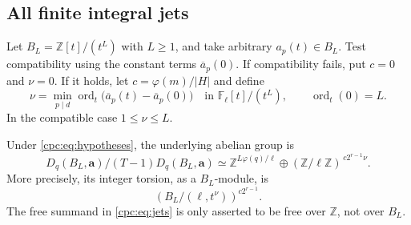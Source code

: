 \subsection{All finite integral jets}

Let $B_L=\mathbb Z[t]/(t^L)$ with $L\ge1$, and take arbitrary
$a_p(t)\in B_L$. Test compatibility using the constant terms
$\overline a_p(0)$. If compatibility fails, put $c=0$ and
$\nu=0$. If it holds, let $c=\varphi(m)/|H|$ and define
\begin{equation}\label{cpc:eq:contact}
 \nu=\min_{p\mid d}
 \operatorname{ord}_t\bigl(\overline a_p(t)-\overline a_p(0)\bigr)
 \quad\text{in }\mathbb F_\ell[t]/(t^L),
 \qquad\operatorname{ord}_t(0)=L.
\end{equation}
In the compatible case $1\le\nu\le L$.

\begin{theorem}
\label{cpc:thm:jets}
Under \eqref{cpc:eq:hypotheses}, the underlying abelian group is
\begin{equation}\label{cpc:eq:jets}
 \boxed{\displaystyle
 D_q(B_L,\mathbf a)/(T-1)D_q(B_L,\mathbf a)
 \simeq\mathbb Z^{L\varphi(q)/\ell}
       \oplus(\mathbb Z/\ell\mathbb Z)^{\,c2^{r-1}\nu}.}
\end{equation}
More precisely, its integer torsion, as a $B_L$-module, is
\begin{equation}\label{cpc:eq:jetmodule}
 \left(B_L/(\ell,t^\nu)\right)^{c2^{r-1}}.
\end{equation}
The free summand in \eqref{cpc:eq:jets} is only asserted to be
free over $\mathbb Z$, not over $B_L$.
\end{theorem}

